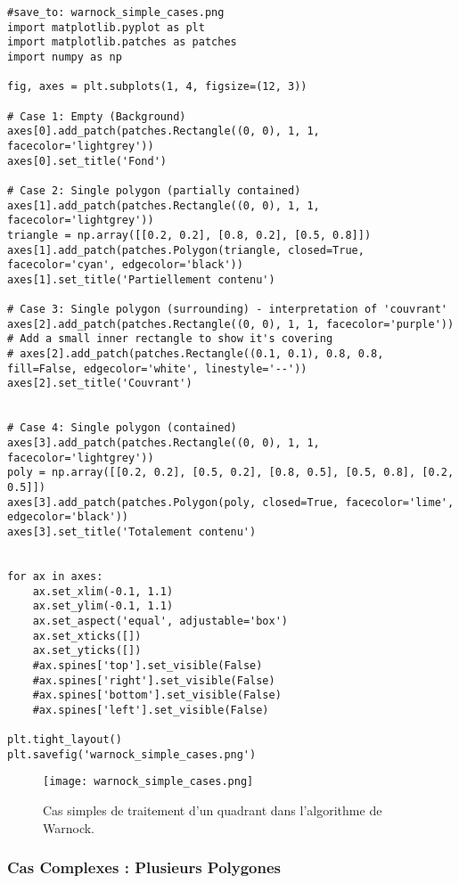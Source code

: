 \documentclass{article}
\begin{document}
\begin{verbatim}
#save_to: warnock_simple_cases.png
import matplotlib.pyplot as plt
import matplotlib.patches as patches
import numpy as np

fig, axes = plt.subplots(1, 4, figsize=(12, 3))

# Case 1: Empty (Background)
axes[0].add_patch(patches.Rectangle((0, 0), 1, 1, facecolor='lightgrey'))
axes[0].set_title('Fond')

# Case 2: Single polygon (partially contained)
axes[1].add_patch(patches.Rectangle((0, 0), 1, 1, facecolor='lightgrey'))
triangle = np.array([[0.2, 0.2], [0.8, 0.2], [0.5, 0.8]])
axes[1].add_patch(patches.Polygon(triangle, closed=True, facecolor='cyan', edgecolor='black'))
axes[1].set_title('Partiellement contenu')

# Case 3: Single polygon (surrounding) - interpretation of 'couvrant'
axes[2].add_patch(patches.Rectangle((0, 0), 1, 1, facecolor='purple'))
# Add a small inner rectangle to show it's covering
# axes[2].add_patch(patches.Rectangle((0.1, 0.1), 0.8, 0.8, fill=False, edgecolor='white', linestyle='--'))
axes[2].set_title('Couvrant')


# Case 4: Single polygon (contained)
axes[3].add_patch(patches.Rectangle((0, 0), 1, 1, facecolor='lightgrey'))
poly = np.array([[0.2, 0.2], [0.5, 0.2], [0.8, 0.5], [0.5, 0.8], [0.2, 0.5]])
axes[3].add_patch(patches.Polygon(poly, closed=True, facecolor='lime', edgecolor='black'))
axes[3].set_title('Totalement contenu')


for ax in axes:
    ax.set_xlim(-0.1, 1.1)
    ax.set_ylim(-0.1, 1.1)
    ax.set_aspect('equal', adjustable='box')
    ax.set_xticks([])
    ax.set_yticks([])
    #ax.spines['top'].set_visible(False)
    #ax.spines['right'].set_visible(False)
    #ax.spines['bottom'].set_visible(False)
    #ax.spines['left'].set_visible(False)

plt.tight_layout()
plt.savefig('warnock_simple_cases.png')
\end{verbatim}

\begin{figure}[H]
\centering
\texttt{[image: warnock\_simple\_cases.png]}
\caption{Cas simples de traitement d'un quadrant dans l'algorithme de Warnock.}
\label{fig:warnock_simple_cases}
\end{figure}

\subsubsection{Cas Complexes : Plusieurs Polygones}
\end{document}
